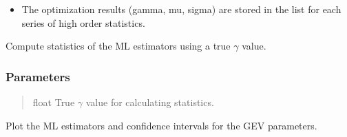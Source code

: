 \documentclass[a4paper,11pt,openany,english]{sphinxmanual}
\begin{document}
\begin{fulllineitems}
\begin{fulllineitems}
\begin{itemize}
\item {} 
\sphinxAtStartPar
The optimization results (gamma, mu, sigma) are stored in the  list for each series of high order statistics.

\end{itemize}

\end{fulllineitems}


\begin{fulllineitems}
\label{\detokenize{api_topt:xtremes.topt.ML_estimators.get_statistics}}
\pysigstartsignatures
{}
\pysigstopsignatures
\sphinxAtStartPar
Compute statistics of the ML estimators using a true \(\gamma\) value.


\subsubsection{Parameters}
\label{\detokenize{api_topt:id59}}\begin{quote}\begin{description}
\sphinxAtStartPar
float
True \(\gamma\) value for calculating statistics.

\end{description}\end{quote}

\end{fulllineitems}


\begin{fulllineitems}
\label{\detokenize{api_topt:xtremes.topt.ML_estimators.plot}}
\pysigstartsignatures
{}
\pysigstopsignatures
\sphinxAtStartPar
Plot the ML estimators and confidence intervals for the GEV parameters.



\end{fulllineitems}
\end{fulllineitems}
\end{document}
